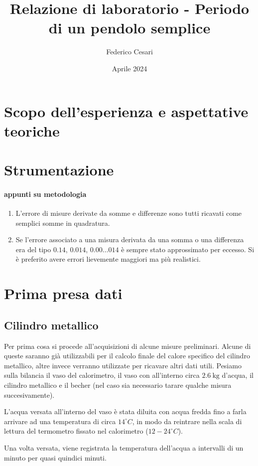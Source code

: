 \documentclass{article}
\title{Relazione di laboratorio - Periodo di un pendolo semplice}
\author{Federico Cesari}
\date{Aprile 2024}
\begin{document}
	
	\tableofcontents
	
	\newpage
	\section*{Scopo dell’esperienza e aspettative teoriche}
	\section*{Strumentazione}
	\paragraph{appunti su metodologia}
	\begin{enumerate}
		\item L'errore di misure derivate da somme e differenze sono tutti ricavati come semplici somme in quadratura.
		\item Se l'errore associato a una misura derivata da una somma o una differenza era del tipo \(0.14\), \(0.014\), \(0.00\dots 014\) è sempre stato approssimato per eccesso. Si è preferito avere errori lievemente maggiori ma più realistici.
	\end{enumerate}
	
	\newpage
	\section{Prima presa dati}
	\subsection{Cilindro metallico}
	Per prima cosa si procede all'acquisizioni di alcune misure preliminari. Alcune di queste saranno già utilizzabili per il calcolo finale del calore specifico del cilindro metallico, altre invece verranno utilizzate per ricavare altri dati utili. Pesiamo sulla bilancia il vaso del calorimetro, il vaso con all'interno circa \(2.6 \SI{}{\kilogram}\) d'acqua, il cilindro metallico e il becher (nel caso sia necessario tarare qualche misura succesivamente).
	
	L'acqua versata all'interno del vaso è stata diluita con acqua fredda fino a farla arrivare ad una temperatura di circa \(14 ^\circ C\), in modo da reintrare nella scala di lettura del termometro fissato nel calorimetro (\(12-24 ^\circ C\)).
	
	Una volta versata, viene registrata la temperatura dell'acqua a intervalli di un minuto per quasi quindici minuti.
	
\end{document}
